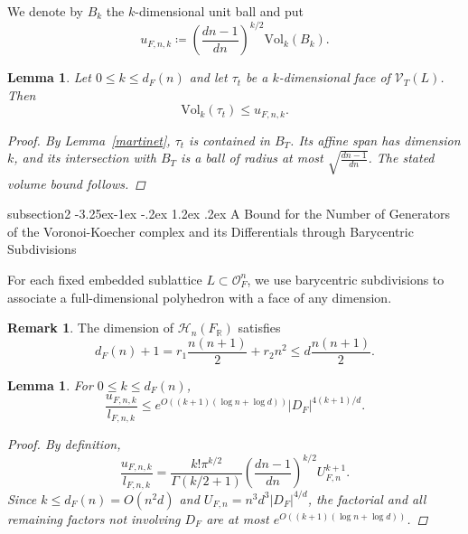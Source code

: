 \documentclass[11pt,a4paper,twoside]{amsart}
\makeatletter
\renewcommand{\subsection}{\@startsection
  {subsection}{2}{\z@}%
  {-3.25ex\@plus -1ex \@minus -.2ex}%
  {1.2ex \@plus .2ex}%
  {\normalfont\bfseries}}
\theoremstyle{plain}
\newtheorem{lemma}[theorem]{\bfseries Lemma}
\theoremstyle{definition}
\newtheorem{remark}[theorem]{\bfseries Remark}
\newcommand{\rint}[0]{\mathcal{O}_F}
\newcommand{\disc}[0]{D_F}
\newcommand{\Her}[0]{\mathcal{H}_n(\fr)}
\newcommand{\vol}[0]{\mathrm{Vol}}
\newcommand{\fr}[0]{F_\mathbb{R}}
\renewcommand{\leq}{\leqslant}
\makeatother
\begin{document}
We denote by $B_k$ the $k$-dimensional unit ball and put
$$u_{F,n,k}\coloneqq\left(\frac{dn-1}{dn}\right)^{k/2}\vol_k(B_k).$$
\begin{lemma}
\label{bound_volume_face}
Let $0\leq k\leq d_F(n)$ and let $\tau_t$ be a $k$-dimensional face of $\mathcal V_T(L)$. Then
$$\vol_k(\tau_t)\leq u_{F,n,k}.$$
\begin{proof}
By Lemma~\ref{martinet}, $\tau_t$ is contained in $B_T$. Its affine span has dimension $k$, and its intersection with $B_T$ is a ball of radius at most $\sqrt{\frac{dn-1}{dn}}$. The stated volume bound follows.
\end{proof}
\end{lemma}

\subsection{A Bound for the Number of Generators of the Voronoi-Koecher complex and its Differentials through Barycentric Subdivisions}

For each fixed embedded sublattice $L\subset \rint ^n$, we use barycentric subdivisions to associate a full-dimensional polyhedron with a face of any dimension. 

\begin{remark}
\label{real_dimension_hermitian_matrices}
The dimension of $\Her$ satisfies
$$d_F(n)+1=r_1\frac{n(n+1)}2+r_2n^2\leq d\frac{n(n+1)}2.$$
\end{remark}

\begin{lemma}
\label{order_bound}
For $0\leq k\leq d_F(n)$,
$$\frac{u_{F,n,k}}{l_{F,n,k}}\leq e^{O((k+1)(\log n+\log d))}|\disc|^{4(k+1)/d}.$$
\begin{proof}
By definition,
$$\frac{u_{F,n,k}}{l_{F,n,k}}=\frac{k!\pi^{k/2}}{\Gamma(k/2+1)}\left(\frac{dn-1}{dn}\right)^{k/2}U_{F,n}^{k+1}.$$
Since $k\leq d_F(n)=O(n^2d)$ and $U_{F,n}=n^3d^3|\disc|^{4/d}$, the factorial and all remaining factors not involving $\disc$ are at most $e^{O((k+1)(\log n+\log d))}$.
\end{proof}
\end{lemma}
\end{document}

